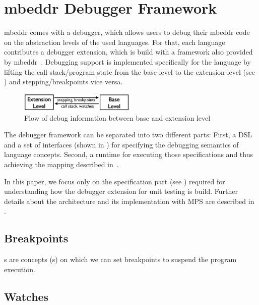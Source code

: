 \section{mbeddr Debugger Framework}
\label{mbeddrDebugger}
\label{mbeddrDebuggerFramework}

mbeddr comes with a debugger, which allows users to debug their mbeddr code 
on the abstraction levels of the used languages. For that, each language
contributes a debugger extension, which is build with a framework also provided
by mbeddr~\cite{DBLP:conf/adaEurope/AdaEuropeDeb}.
Debugging support is implemented specifically for the language by
lifting the call stack/program state from the base-level to the
extension-level (see ) and stepping/breakpoints
vice versa.

\begin{figure}[h]
  \vspace{-3mm}
  \centering
    \includegraphics[width=5.5cm]{./figures/two-levels.png} 
    \vspace{-2mm}
    \caption{Flow of debug information between base and
    extension level~\cite{DBLP:conf/adaEurope/AdaEuropeDeb}}
  \label{infoFlow}
  \vspace{-2mm}
\end{figure}



The debugger framework can be separated into two different parts: First, a
\ac{DSL} and a set of interfaces (shown in ) for specifying the
debugging semantics of language concepts. 
Second, a runtime for executing those specifications and
thus achieving the mapping described in~. 

In this paper, we focus only on the specification part (see
) required for understanding how the debugger extension
for unit testing is build.
Further details about the architecture and its implementation with \ac{MPS} are
described in \cite{DBLP:conf/adaEurope/AdaEuropeDeb}. 


\subsection{Breakpoints}
s are concepts (\eg {}s) on which
we can set breakpoints to suspend the program execution.


\subsection{Watches}

